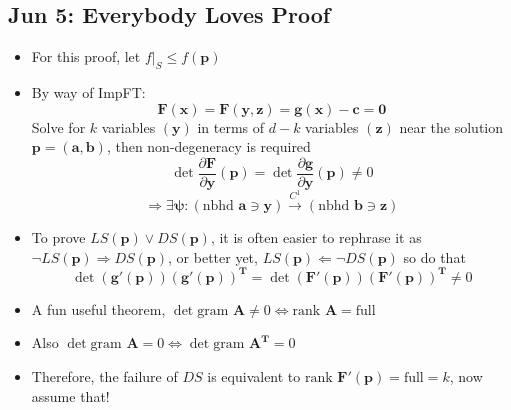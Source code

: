 \documentclass[10pt, oneside]{article}
\newcommand{\del}{\partial}
\let\leq\leqslant
\renewcommand{\vec}[1]{\mathbf{#1}}
\newcommand{\vecf}[1]{\boldsymbol{#1}}
\newcommand{\mat}[1]{\mathbf{#1}}
\begin{document}
\subsection{Jun 5: Everybody Loves Proof}
\begin{itemize}
    \item For this proof, let $f|_S \leq f(\vec{p})$
    \item By way of ImpFT: 
            \[\vecf{F}(\vec{x}) = \vecf{F}(\vec{y},\vec{z}) =  \vecf{g}(\vec{x}) - \vec{c} = \vec{0}\]
        Solve for $k$ variables $(\vec{y})$ in terms of $d - k$ variables $(\vec{z})$ near the solution $\vec{p} = (\vec{a},\vec{b})$, then non-degeneracy is required
            \[\det \frac{\del \vecf{F}}{\del \vec{y}} (\vec{p}) = \det \frac{\del \vecf{g}}{\del \vec{y}} (\vec{p}) \neq 0\]
            \[ \Rightarrow \exists \vecf{\psi} : (\text{nbhd } \vec{a} \ni \vec{y}) \overset{C^1}{\rightarrow} (\text{nbhd } \vec{b} \ni \vec{z})\]
    \item To prove $LS(\vec{p}) \lor DS(\vec{p})$, it is often easier to rephrase it as $\lnot LS(\vec{p}) \Rightarrow DS(\vec{p})$, or better yet, $LS(\vec{p}) \Leftarrow \lnot DS(\vec{p})$ so do that
            \[ \det (\vecf{g}'(\vec{p}))(\vecf{g}'(\vec{p}))^\mat{T} = \det (\vecf{F}'(\vec{p}))(\vecf{F}'(\vec{p}))^\mat{T} \neq 0\]
    \item A fun useful theorem, $\det \text{gram } \mat{A} \neq 0 \Leftrightarrow \text{rank } \mat{A} = \text{full}$
    \item Also $\det \text{gram } \mat{A} = 0 \Leftrightarrow \det \text{gram } \mat{A^T} = 0$
    \item Therefore, the failure of $DS$ is equivalent to $\text{rank }\vecf{F}'(\vec{p}) =  \text{full} = k$, now assume that!
\end{itemize}
\end{document}
